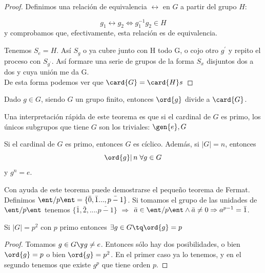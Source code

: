 \documentclass[nochap]{apuntes}
\begin{document}
  \begin{proof} Definimos una relación de equivalencia $\rel$ en $G$ a partir del grupo $H$:
  
   \[ g_{1}\rel g_{2} \Leftrightarrow g_{1}^{-1}g_{2}\in H \]  y comprobamos que, efectivamente, esta relación es de equivalencia.
   
   Tenemos $S_{e}=H$. Así $S_{g}$  o ya cubre junto con H todo G, o cojo otro $g^{'}$  y repito el proceso con $S_{g^{'}}$.
   Así formare una serie de grupos de la forma $S_{x}$  disjuntos dos a dos y cuya unión me da G.\\
   De esta forma podemos ver que $\card{G}=\card{H}  s$
  \end{proof}
  
  \begin{theorem}
   Dado $g \in  G$, siendo $G$ un grupo finito, entonces $\ord{g}$ divide a $\card{G}$. 
  \end{theorem}
  
  Una interpretación rápida de este teorema es que si el cardinal de $G$ es primo, los únicos subgrupos que tiene $G$ son los triviales: $\gen{e}, G$
  
  \begin{theorem}
   Si el cardinal de $G$ es primo, entonces $G$ es cíclico. Además, si $|G|=n$, entonces \[ \ord{g} | \, n \; \forall g\in G\] y $g^n = e$.
  \end{theorem}
  
  \begin{example}
   Con ayuda de este teorema puede demostrarse el pequeño teorema de Fermat. 
   Definimos $\ent/p\ent=\{\bar{0},\bar{1}...,\bar{p-1}\}$.
   Si tomamos el grupo de las unidades de $\ent/p\ent$ tenemos $\{\bar{1}, \bar{2},....\bar{p-1}\}$ $\Rightarrow$
   $\bar{a}\in\ent/p\ent \wedge \bar{a}\neq 0 \Rightarrow a^{p-1}=\bar{1}$.
  \end{example}
  
  \begin{theorem}
   Si $|G|=p^{2}$  con $p$ primo entonces $\exists g \in G \tq \ord{g}=p$
  \end{theorem}
  
  \begin{proof}
   Tomamos $g\in G \y g\neq e$. Entonces sólo hay dos posibilidades, o bien $\ord{g}=p$ o bien $\ord{g}=p^{2}$. En el primer caso ya lo tenemos, y en el segundo tenemos que existe $g^p$ que tiene orden $p$.
  \end{proof}
  
\end{document}
